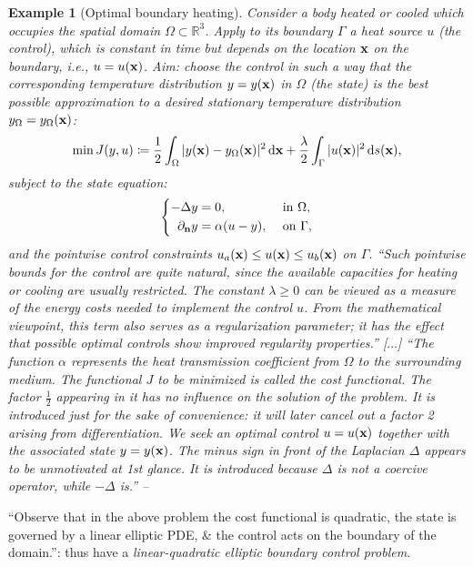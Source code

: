 \documentclass[oneside]{book}
\numberwithin{equation}{section}
\newtheorem{example}{Example}[chapter]
\begin{document}
\begin{example}[Optimal boundary heating]
	Consider a body heated or cooled which occupies the spatial domain $\Omega\subset\mathbb{R}^3$. Apply to its boundary $\Gamma$ a \emph{heat source} $u$ (the \emph{control}), which is constant in time but depends on the location ${\bf x}$ on the boundary, i.e., $u = u({\bf x})$. Aim: choose the control in such a way that the corresponding \emph{temperature distribution} $y = y({\bf x})$ in $\Omega$ (the \emph{state}) is the best possible approximation to a desired stationary temperature distribution $y_\Omega = y_\Omega({\bf x})$:
	\begin{align*}
		\min J(y,u)\coloneqq\frac{1}{2}\int_\Omega |y({\bf x}) - y_\Omega({\bf x})|^2\,{\rm d}{\bf x} + \frac{\lambda}{2}\int_\Gamma |u({\bf x})|^2\,{\rm d}s({\bf x}),
	\end{align*}
	subject to the \emph{state equation}:
	\begin{equation*}
		\left\{\begin{split}
			-\Delta y &= 0,&&\mbox{ in }\Omega,\\
			\partial_{\bf n}y &= \alpha(u - y),&&\mbox{ on }\Gamma,
		\end{split}\right.
	\end{equation*}
	and the \emph{pointwise control constraints} $u_a({\bf x})\le u({\bf x})\le u_b({\bf x})$ on $\Gamma$. ``Such pointwise bounds for the control are quite natural, since the available capacities for heating or cooling are usually restricted. The constant $\lambda\ge 0$ can be viewed as a measure of the energy costs needed to implement the control $u$. From the mathematical viewpoint, this term also serves as a \emph{regularization parameter}; it has the effect that possible optimal controls show improved regularity properties.'' [$\ldots$] ``The function $\alpha$ represents the \emph{heat transmission coefficient} from $\Omega$ to the surrounding medium. The functional $J$ to be minimized is called the \emph{cost functional}. The factor $\frac{1}{2}$ appearing in it has no influence on the solution of the problem. It is introduced just for the sake of convenience: it will later cancel out a factor 2 arising from differentiation. We seek an optimal control $u = u({\bf x})$ together with the associated state $y = y({\bf x})$. The minus sign in front of the Laplacian $\Delta$ appears to be unmotivated at 1st glance. It is introduced because $\Delta$ is not a \emph{coercive operator}, while $-\Delta$ is.'' -- \cite[p. 4]{Troltzsch2010}
\end{example}
``Observe that in the above problem the cost functional is quadratic, the state is governed by a linear elliptic PDE, \& the control acts on the boundary of the domain.'': thus have a \textit{linear-quadratic elliptic boundary control problem}.
\end{document}
